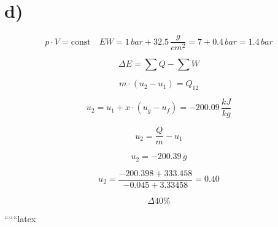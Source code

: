 

\section*{d)}

\[
p \cdot V = \text{const} \quad EW = 1 \, bar + 32.5 \, \frac{g}{cm^2} = 7 + 0.4 \, bar = 1.4 \, bar
\]

\[
\Delta E = \sum Q - \sum W
\]

\[
m \cdot (u_2 - u_1) = Q_{12}
\]

\[
u_2 = u_1 + x \cdot (u_g - u_f) = -200.09 \, \frac{kJ}{kg}
\]

\[
u_2 = \frac{Q}{m} - u_1
\]

\[
u_2 = -200.39 \, g
\]

\[
u_2 = \frac{-200.398 + 333.458}{-0.045 + 3.33458} = 0.40
\]

\[
\Delta 40\%
\]

``````latex